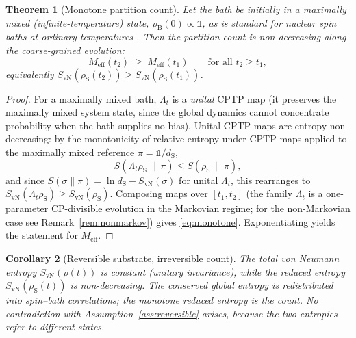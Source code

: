\documentclass[twocolumn,10pt,a4paper]{article}
\theoremstyle{thmstyle}
\newtheorem{theorem}{Theorem}[section]
\newtheorem{corollary}[theorem]{Corollary}
\theoremstyle{definition}
\theoremstyle{remark}
\newcommand{\sysrho}{\rho_{\mathrm{S}}}
\newcommand{\Svn}{S_{\mathrm{vN}}}
\newcommand{\Meff}{M_{\mathrm{eff}}}
\begin{document}
\begin{theorem}[Monotone partition count]
\label{thm:monotone}
Let the bath be initially in a maximally mixed (infinite-temperature)
state, $\rho_{\mathrm{B}}(0)\propto\mathbb{1}$, as is standard for nuclear
spin baths at ordinary temperatures \citep{abragam1961}. Then the partition
count is non-decreasing along the coarse-grained evolution:
\begin{equation}
\Meff(t_{2})\;\geq\;\Meff(t_{1})\qquad\text{for all }t_{2}\geq t_{1},
\label{eq:monotone}
\end{equation}
equivalently $\Svn(\sysrho(t_{2}))\geq\Svn(\sysrho(t_{1}))$.
\end{theorem}

\begin{proof}
For a maximally mixed bath, $\Lambda_{t}$ is a \emph{unital} CPTP map
(it preserves the maximally mixed system state, since the global dynamics
cannot concentrate probability when the bath supplies no bias). Unital
CPTP maps are entropy non-decreasing: by the monotonicity of relative
entropy under CPTP maps \citep{lindblad1975} applied to the maximally
mixed reference $\pi=\mathbb{1}/d_{\mathrm{S}}$,
\begin{equation}
S(\Lambda_{t}\sysrho\,\|\,\pi)\leq S(\sysrho\,\|\,\pi),
\end{equation}
and since $S(\sigma\|\pi)=\ln d_{\mathrm{S}}-\Svn(\sigma)$ for unital
$\Lambda_{t}$, this rearranges to
$\Svn(\Lambda_{t}\sysrho)\geq\Svn(\sysrho)$. Composing maps over
$[t_{1},t_{2}]$ (the family $\Lambda_{t}$ is a one-parameter CP-divisible
evolution in the Markovian regime; for the non-Markovian case see
Remark~\ref{rem:nonmarkov}) gives \eqref{eq:monotone}. Exponentiating
yields the statement for $\Meff$.
\end{proof}

\begin{corollary}[Reversible substrate, irreversible count]
\label{cor:reversible-irreversible}
The total von Neumann entropy $\Svn(\rho(t))$ is constant (unitary
invariance), while the reduced entropy $\Svn(\sysrho(t))$ is
non-decreasing. The conserved global entropy is redistributed into
spin--bath correlations; the monotone reduced entropy is the count. No
contradiction with Assumption~\ref{ass:reversible} arises, because the two
entropies refer to different states.
\end{corollary}
\end{document}

